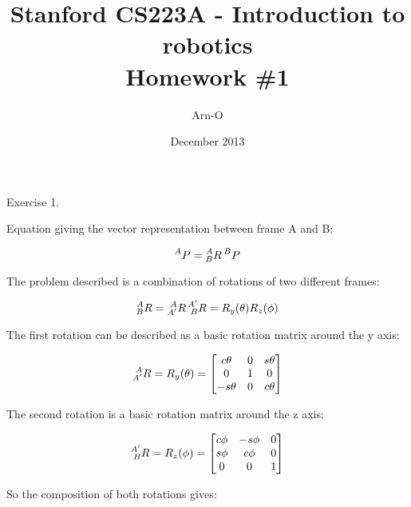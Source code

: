 \documentclass{article}
\begin{document}
\title{Stanford CS223A - Introduction to robotics \\
  Homework \#1}
\author{Arn-O}
\date{December 2013}
\maketitle

Exercise 1.

Equation giving the vector representation between frame A and B:

\begin{equation}
  \prescript{A}{}{P} = \prescript{A}{B}{R} \prescript{B}{}{P}
\end{equation}

The problem described is a combination of rotations of two different frames:

\begin{equation}
  \prescript{A}{B}{R} = \prescript{A}{A'}{R} \prescript{A'}{B}{R} = R_{y}(\theta) R_{z}(\phi)
\end{equation}

The first rotation can be described as a basic rotation matrix around the y axis:

\begin{equation}
  \prescript{A}{A'}{R} = R_{y}(\theta) = \begin{bmatrix}
                                            c\theta  & 0 & s\theta \\
                                            0        & 1 & 0        \\
                                            -s\theta & 0 & c\theta
                                          \end{bmatrix}
\end{equation}

The second rotation is a basic rotation matrix around the z axis:

\begin{equation}
  \prescript{A'}{B}{R} = R_{z}(\phi) = \begin{bmatrix}
                                          c\phi & -s\phi & 0 \\
                                          s\phi & c\phi  & 0 \\
                                          0     & 0      & 1
                                        \end{bmatrix}
\end{equation}

So the composition of both rotations gives:
\end{document}
